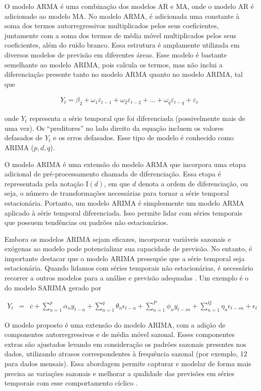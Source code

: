 O modelo ARMA é uma combinação dos modelos AR  e MA, onde o modelo AR é adicionado ao modelo MA.
No modelo ARMA, é adicionada uma constante à soma dos termos autorregressivos multiplicados pelos seus coeficientes, juntamente com a soma dos termos de média móvel multiplicados pelos seus coeficientes, além do ruído branco. Essa estrutura é amplamente utilizada em diversos modelos de previsão em diferentes áreas.
Esse modelo é bastante semelhante ao modelo ARIMA, pois calcula os termos, mas não inclui a diferenciação presente tanto no modelo ARMA quanto no modelo ARIMA, tal que

\begin{eqnarray}
	Y_t = \beta_2 + \omega_1\varepsilon_{t-1} + \omega_2 \varepsilon_{t-2} +\ldots+ \omega_q \varepsilon_{t-q} + \varepsilon_t \label{arima}
\end{eqnarray}

\noindent onde $Y_t$ representa a série temporal que foi diferenciada (possivelmente mais de uma vez). Os ``preditores'' no lado direito da equação incluem os valores defasados de $Y_t$ e os erros defasados. Esse tipo de modelo é conhecido como ARIMA ($p, d, q$).

O modelo ARIMA é uma extensão do modelo ARMA que incorpora uma etapa adicional de pré-processamento chamada de diferenciação. Essa etapa é representada pela notação I$(d)$, em que $d$ denota a ordem de diferenciação, ou seja, o número de transformações necessárias para tornar a série temporal estacionária. Portanto, um modelo ARIMA é simplesmente um modelo ARMA aplicado à série temporal diferenciada. Isso permite lidar com séries temporais que possuem tendências ou padrões não estacionários.

Embora os modelos ARIMA sejam eficazes, incorporar variáveis sazonais e exógenas ao modelo pode potencializar sua capacidade de previsão. No entanto, é importante destacar que o modelo ARIMA pressupõe que a série temporal seja estacionária. Quando lidamos com séries temporais não estacionárias, é necessário recorrer a outros modelos para a análise e previsão adequadas  \cite{arima}. Um exemplo é o do modelo SARIMA gerado por



\begin{eqnarray}
	Y_t&=&c+\sum_{n=1}^p \alpha_n y_{t-n}+\sum_{n=1}^q \theta_n \epsilon_{t-n}+\sum_{n=1}^P \phi_n y_{t-s n}+\sum_{n=1}^Q \eta_n \epsilon_{t-s n}+\epsilon_t \label{sarima}
\end{eqnarray}

O modelo proposto é uma extensão do modelo ARIMA, com a adição de componentes autorregressivos e de média móvel sazonal. Esses componentes extras são ajustados levando em consideração os padrões sazonais presentes nos dados, utilizando atrasos correspondentes à frequência sazonal (por exemplo, 12 para dados mensais). Essa abordagem permite capturar e modelar de forma mais precisa as variações sazonais e melhorar a qualidade das previsões em séries temporais com esse comportamento cíclico \cite{sarima}.

